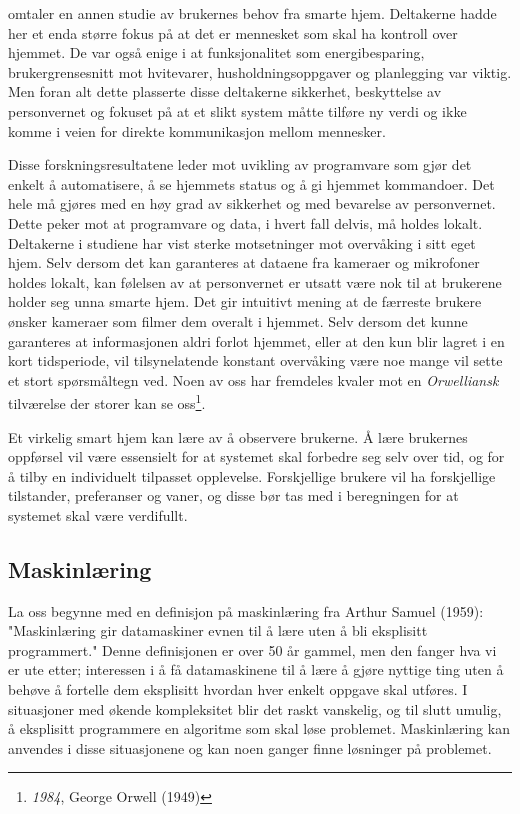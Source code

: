 \citet{userreq} omtaler en annen studie av brukernes behov fra smarte hjem. Deltakerne hadde her et enda større fokus på at det er mennesket som skal ha kontroll over hjemmet. De var også enige i at funksjonalitet som energibesparing, brukergrensesnitt mot hvitevarer, husholdningsoppgaver og planlegging var viktig. Men foran alt dette plasserte disse deltakerne sikkerhet, beskyttelse av personvernet og fokuset på at et slikt system måtte tilføre ny verdi og ikke komme i veien for direkte kommunikasjon mellom mennesker. 

Disse forskningsresultatene leder mot uvikling av programvare som gjør det enkelt å automatisere, å se hjemmets status og å gi hjemmet kommandoer. Det hele må gjøres med en høy grad av sikkerhet og med bevarelse av personvernet. Dette peker mot at programvare og data, i hvert fall delvis, må holdes lokalt. Deltakerne i studiene har vist sterke motsetninger mot overvåking i sitt eget hjem. Selv dersom det kan garanteres at dataene fra kameraer og mikrofoner holdes lokalt, kan følelsen av at personvernet er utsatt være nok til at brukerene holder seg unna smarte hjem. Det gir intuitivt mening at de færreste brukere ønsker kameraer som filmer dem overalt i hjemmet. Selv dersom det kunne garanteres at informasjonen aldri forlot hjemmet, eller at den kun blir lagret i en kort tidsperiode, vil tilsynelatende konstant overvåking være noe mange vil sette et stort spørsmåltegn ved. Noen av oss har fremdeles kvaler mot en \emph{Orwelliansk} tilværelse der storer kan se oss\footnote{\emph{1984}, George Orwell (1949)}.

Et virkelig smart hjem kan lære av å observere brukerne. Å lære brukernes oppførsel vil være essensielt for at systemet skal forbedre seg selv over tid, og for å tilby en individuelt tilpasset opplevelse. Forskjellige brukere vil ha forskjellige tilstander, preferanser og vaner, og disse bør tas med i beregningen for at systemet skal være verdifullt.

\subsection{Maskinlæring}
La oss begynne med en definisjon på maskinlæring fra Arthur Samuel (1959): "Maskinlæring gir datamaskiner evnen til å lære uten å bli eksplisitt programmert." Denne definisjonen er over 50 år gammel, men den fanger hva vi er ute etter; interessen i å få datamaskinene til å lære å gjøre nyttige ting uten å behøve å fortelle dem eksplisitt hvordan hver enkelt oppgave skal utføres. I situasjoner med økende kompleksitet blir det raskt vanskelig, og til slutt umulig, å eksplisitt programmere en algoritme som skal løse problemet. Maskinlæring kan anvendes i disse situasjonene og kan noen ganger finne løsninger på problemet.

